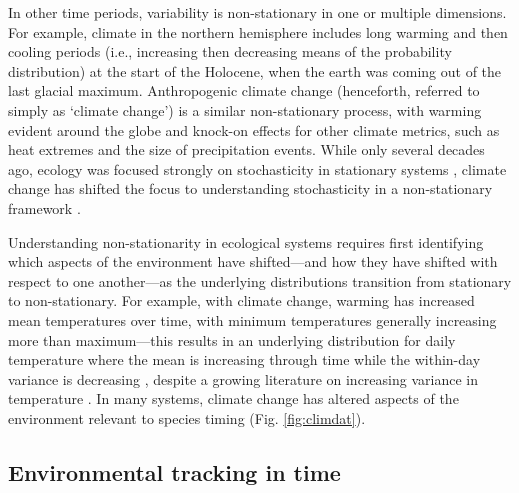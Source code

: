 \documentclass[11pt,letterpaper]{article}
\begin{document}
In other time periods, variability is non-stationary in one or multiple dimensions. For example, climate in the northern hemisphere includes long warming and then cooling periods (i.e., increasing then decreasing means of the probability distribution) at the start of the Holocene, when the earth was coming out of the last glacial maximum. Anthropogenic climate change (henceforth, referred to simply as `climate change') is a similar non-stationary process, with warming evident around the globe and knock-on effects for other climate metrics, such as heat extremes and the size of precipitation events. While only several decades ago, ecology was focused strongly on stochasticity in stationary systems \citep[e.g.,][]{Ripa1996,Kaitala1997}, climate change has shifted the focus to understanding stochasticity in a non-stationary framework \citep[e.g.,][]{cazwavelets,ehrlen2016}.

Understanding non-stationarity in ecological systems requires first identifying which aspects of the environment have shifted---and how they have shifted with respect to one another---as the underlying distributions transition from stationary to non-stationary. For example, with climate change, warming has increased mean temperatures over time, with minimum temperatures generally increasing more than maximum---this results in an underlying distribution for daily temperature where the mean is increasing through time while the within-day variance is decreasing \citep{ipcc2013,screen2014}, despite a growing literature on increasing variance in temperature \citep[e.g.,][]{vasseur2014}. In many systems, climate change has altered aspects of the environment relevant to species timing (Fig. \ref{fig:climdat}).

\subsection{Environmental tracking in time}
\end{document}
